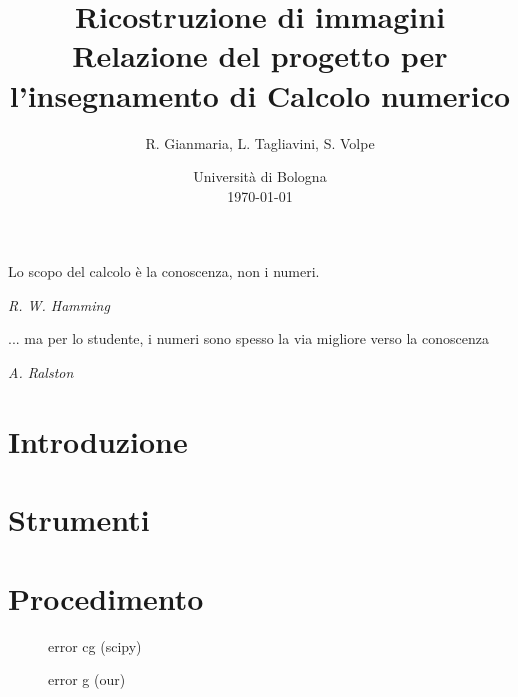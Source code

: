 \documentclass[a4paper]{article}
\title{Ricostruzione di immagini \\ \large Relazione del progetto per l'insegnamento di Calcolo numerico}
\author{
  R. Gianmaria,
  L. Tagliavini,
  S. Volpe
}
\date{
	Universit\`a di Bologna \\
  \today
}
\begin{document}
\maketitle
\thispagestyle{empty}

\epigraph{Lo scopo del calcolo è la conoscenza, non i numeri.}
{\textit{R. W. Hamming}}
\epigraph{... ma per lo studente, i numeri sono spesso la via migliore verso la
conoscenza}
{\textit{A. Ralston}}

\section{Introduzione}


\section{Strumenti}


\section{Procedimento}

\begin{figure}
    \begin{center}
        \scalebox{0.65}{}
        \scalebox{0.65}{}
    \end{center}
    \caption{error cg (scipy)}
\end{figure}
\begin{figure}
    \begin{center}
        \scalebox{0.65}{}
        \scalebox{0.65}{}
    \end{center}
    \caption{error g (our)}
\end{figure}
\end{document}
